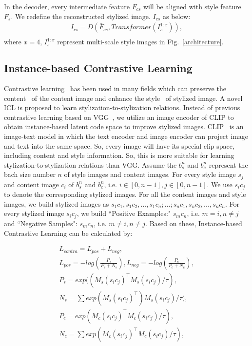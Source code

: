 \documentclass[times,twocolumn,final,authoryear]{elsarticle}
\begin{document}
In the decoder, every intermediate feature $F_{cs}$ will be aligned with style feature $F_{s}$. We redefine the reconstructed stylized image. $I_{cs}$ as below: 
\begin{equation}
\begin{aligned}
I_{cs} = D(\bar F_{cs},Transformer(I^{1:x}_{s})),\\
\end{aligned}
\end{equation}
where $x=4$, $I^{1:x}_{s}$ represent multi-scale style images in Fig.~\ref{architecture}.

\subsection{Instance-based Contrastive Learning}
\label{3.3}
Contrastive learning~\citep{wu2021contrastive,santa2018visual,chen2020improved,han2021dual} has been used in many fields which can preserve the content~\citep{han2021dual} of the content image and enhance the style~\citep{chen2021artistic} of stylized image. A novel ICL is proposed to learn stylization-to-stylization relations. Instead of previous contrastive learning based on VGG~\citep{chen2021artistic}, we utilize an image encoder of CLIP to obtain instance-based latent code space to improve stylized images. CLIP~\citep{radford2021learning} is an image-text model in which the text encoder and image encoder can project image and text into the same space. So, every image will have its special clip space, including content and style information. So, this is more suitable for learning stylization-to-stylization relations than VGG. Assume the $b^{n}_{s}$ and $b^{n}_{c}$ represent the bach size number $n$ of style images and content images. For every style image $s_{j}$ and content image $c_{i}$ of $b^{n}_{s}$ and $b^{n}_{c}$, i.e. $i\in[0,n-1], j\in[0,n-1]$. We use $s_{i}c_{j}$ to denote the corresponding stylized images. For all the content images and style images, we build stylized images as ${s_{1}c_{1},s_{1}c_{2},...,s_{1}c_{n};...; s_{n}c_{1},s_{n}c_{2},...,s_{n}c_{n}}$. For every stylized image $s_{i}c_{j}$, we build ``Positive Examples:" $s_{m}c_{n}$, i.e. $m=i, n\neq j$ and ``Negative Samples": $s_{m}c_{n}$, i.e. $m\neq i, n\neq j$. Based on these, Instance-based Contrastive Learning can be calculated by:
\begin{center}
	\begin{equation}
	\begin{aligned}
	L_{contra}= L_{pos} + L_{neg},\qquad\qquad\\
	L_{pos}= -log(\frac{P_s}{P_s+N_s}),L_{neg}= -log(\frac{P_c}{P_c+N_c}),\\
	P_s = exp((M_s(s_{i}c_{j})^{\top}M_s(s_{i}c_{j})/\tau), \\
	N_s =\sum exp(M_s(s_{i}c_{j})^{\top})M_s(s_{i}c_{j})/\tau),\\
	P_c =exp(M_c(s_{i}c_{j})^{\top}M_c(s_{i}c_{j})/\tau),\\
	N_c = \sum exp(M_c(s_{i}c_{j})^{\top}M_c(s_{i}c_{j})/\tau),
	\end{aligned}
	\end{equation}
\end{center}
\end{document}
